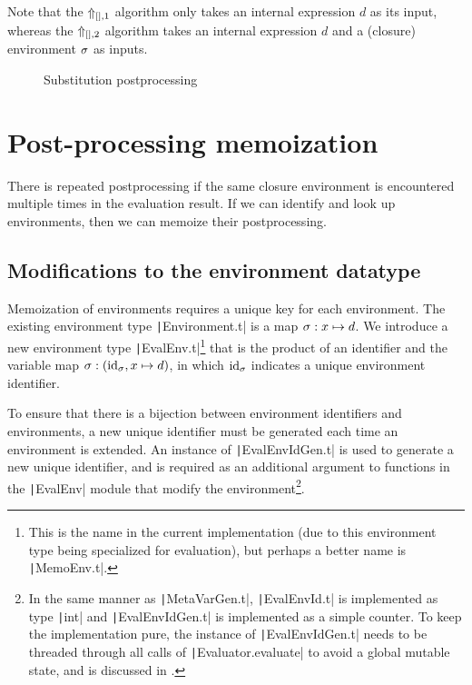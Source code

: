 
Note that the $\Uparrow_{[],1}$ algorithm only takes an internal expression $d$ as its input, whereas the $\Uparrow_{[],2}$ algorithm takes an internal expression $d$ and a (closure) environment $\sigma$ as inputs.


\begin{figure}
  \centering
  \begin{mdframed}
    \begin{singlespace}
      
    \end{singlespace}
  \end{mdframed}
  \caption{Substitution postprocessing}
  \label{fig:big-step-inside-formal}
\end{figure}

\section{Post-processing memoization}
\label{sec:memoization}

There is repeated postprocessing if the same closure environment is encountered multiple times in the evaluation result. If we can identify and look up environments, then we can memoize their postprocessing.

\subsection{Modifications to the environment datatype}
\label{sec:memoization-evalenv}

Memoization of environments requires a unique key for each environment. The existing environment type \texttt|Environment.t| is a map $\sigma:x\mapsto d$. We introduce a new environment type \texttt|EvalEnv.t|\footnote{This is the name in the current implementation (due to this environment type being specialized for evaluation), but perhaps a better name is \texttt|MemoEnv.t|.} that is the product of an identifier and the variable map $\sigma:(\text{id}_\sigma,x\mapsto d)$, in which $\text{id}_\sigma$ indicates a unique environment identifier.

To ensure that there is a bijection between environment identifiers and environments, a new unique identifier must be generated each time an environment is extended. An instance of \texttt|EvalEnvIdGen.t| is used to generate a new unique identifier, and is required as an additional argument to functions in the \texttt|EvalEnv| module that modify the environment\footnote{
  In the same manner as \texttt|MetaVarGen.t|, \texttt|EvalEnvId.t| is implemented as type \texttt|int| and \texttt|EvalEnvIdGen.t| is implemented as a simple counter. To keep the implementation pure, the instance of \texttt|EvalEnvIdGen.t| needs to be threaded through all calls of \texttt|Evaluator.evaluate| to avoid a global mutable state, and is discussed in .
}.

